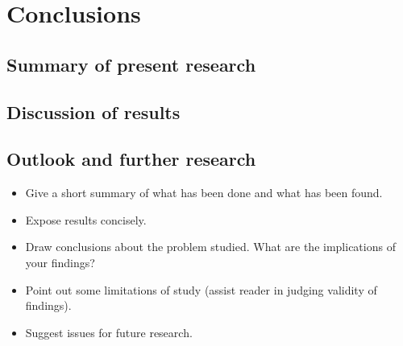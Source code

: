 
\section{Conclusions}\label{Sec:Conc}




\subsection{Summary of present research}\label{Sec:Conclusion;Subsec:Summary}




\subsection{Discussion of results}\label{Sec:Conclusion;Subsec:Discussion}




\subsection{Outlook and further research}\label{Sec:Conclusion;Subsec:Outlook}




\begin{itemize}

    \item Give a short summary of what has been done and what has been
    found.

    \item Expose results concisely.

    \item Draw conclusions about the problem studied. What are the
    implications of your findings?

    \item Point out some limitations of study (assist reader in judging validity
    of findings).

    \item Suggest issues for future research.

\end{itemize}

